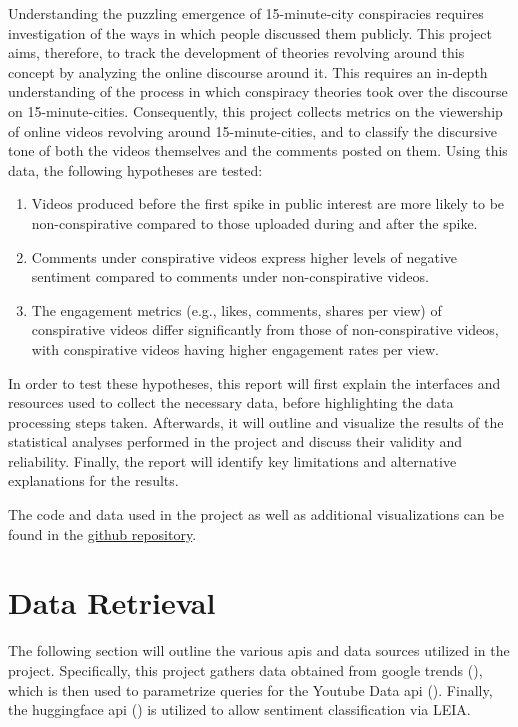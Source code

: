 \documentclass[fontsize=11pt, parskip=half]{scrartcl}
\begin{document}
    Understanding the puzzling emergence of 15-minute-city conspiracies requires investigation of the ways in which people discussed them publicly. This project aims, therefore, to track the development of theories revolving around this concept by analyzing the online discourse around it. This requires an in-depth understanding of the process in which conspiracy theories took over the discourse on 15-minute-cities. Consequently, this project collects metrics on the viewership of online videos revolving around 15-minute-cities, and to classify the discursive tone of both the videos themselves and the comments posted on them. Using this data, the following hypotheses are tested: 

    \begin{enumerate}
        \item Videos produced before the first spike in public interest are more likely to be non-conspirative compared to those uploaded during and after the spike. \label{h:1}
        \item Comments under conspirative videos express higher levels of negative sentiment compared to comments under non-conspirative videos. \label{h:2}
        \item The engagement metrics (e.g., likes, comments, shares per view) of conspirative videos differ significantly from those of non-conspirative videos, with conspirative videos having higher engagement rates per view. \label{h:3}
    \end{enumerate}

In order to test these hypotheses, this report will first explain the interfaces and resources used to collect the necessary data, before highlighting the data processing steps taken. Afterwards, it will outline and visualize the results of the statistical analyses performed in the project and discuss their validity and reliability. Finally, the report will identify key limitations and alternative explanations for the results.

The code and data used in the project as well as additional visualizations can be found in the \href{https://github.com/julia-king-edu/so-24_smda_project}{github repository}.
    
\section{Data Retrieval}
\label{section:retrieval}

    The following section will outline the various apis and data sources utilized in the project. Specifically, this project gathers data obtained from google trends (\citeyear{google15minuteCity2024}), which is then used to parametrize queries for the Youtube Data api (\citeyear{googlefordevelopersYoutubeDataApi2024}). Finally, the huggingface api (\citeyear{huggingfaceTransformers2024}) is utilized to allow sentiment classification via LEIA.
\end{document}
